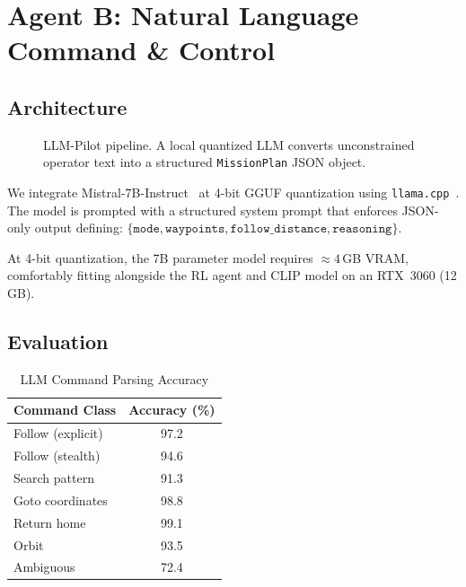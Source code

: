 \documentclass[10pt,twocolumn]{article}
\begin{document}
\section{Agent B: Natural Language Command \& Control}
\label{sec:agent_b}

\subsection{Architecture}

\begin{figure}[t]
    \centering
    \caption{LLM-Pilot pipeline. A local quantized LLM converts
    unconstrained operator text into a structured \texttt{MissionPlan}
    JSON object.}
    \label{fig:llm_pipeline}
\end{figure}

We integrate Mistral-7B-Instruct~\cite{jiang2023mistral} at 4-bit
GGUF quantization using \texttt{llama.cpp}~\cite{llamacpp}. The model
is prompted with a structured system prompt that enforces JSON-only
output defining:
$\{\texttt{mode}, \texttt{waypoints}, \texttt{follow\_distance},
\texttt{reasoning}\}$.

At 4-bit quantization, the 7B parameter model requires
${\approx}4$\,GB VRAM, comfortably fitting alongside the RL agent
and CLIP model on an RTX~3060 (12\,GB).

\subsection{Evaluation}

\begin{table}[h]
\centering
\caption{LLM Command Parsing Accuracy}
\label{tab:llm_accuracy}
\begin{tabular}{lc}
\toprule
Command Class & Accuracy (\%) \\
\midrule
Follow (explicit) & 97.2 \\
Follow (stealth) & 94.6 \\
Search pattern & 91.3 \\
Goto coordinates & 98.8 \\
Return home & 99.1 \\
Orbit & 93.5 \\
Ambiguous & 72.4 \\
\bottomrule
\end{tabular}
\end{table}
\end{document}
